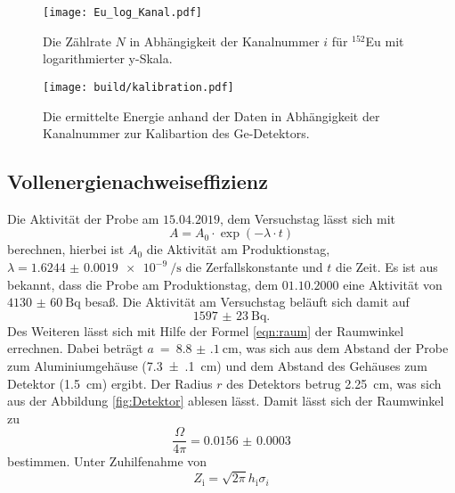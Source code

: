 \begin{figure}[htb]
 \centering
 \texttt{[image: Eu\_log\_Kanal.pdf]}
 \caption{Die Zählrate $N$ in Abhängigkeit der Kanalnummer $i$ für ${}^{152}$Eu mit logarithmierter y-Skala.}
 \label{fig:Eu_log_Kanal}
\end{figure}

\begin{figure}[htb]
 \centering
 \texttt{[image: build/kalibration.pdf]}
 \caption{Die ermittelte Energie anhand der Daten in Abhängigkeit der Kanalnummer zur Kalibartion des Ge-Detektors.}
 \label{fig:kalibration}
\end{figure}


\FloatBarrier

\subsection{Vollenergienachweiseffizienz}
\label{sec:Vollenergienachweiseffizenz}
Die Aktivität der Probe am $15.04.2019$, dem Versuchstag lässt sich mit
\begin{equation}
  A = A_0 \cdot \exp{\left(-\lambda \cdot t\right)}
\end{equation}
berechnen, hierbei ist $A_0$ die Aktivität am Produktionstag,
$\lambda = \SI[per-mode = reciprocal-positive-first]{1.6244(19)e-9}{\per\second}$ \cite{referenz1} 
die Zerfallskonstante und $t$ die Zeit. Es ist aus \cite{V18} bekannt, dass die Probe am Produktionstag, dem
$01.10.2000$ eine Aktivität von $\SI{4130(60)}{\becquerel}$ besaß.
Die Aktivität am Versuchstag beläuft sich damit auf
\begin{equation*}
  \SI{1597(23)}{\becquerel}.
\end{equation*}
Des Weiteren lässt sich mit Hilfe der Formel \ref{eqn:raum} der Raumwinkel errechnen.
Dabei beträgt $a~=~\SI{8.8(1)}{\centi\meter}$, was sich aus dem Abstand der Probe zum
Aluminiumgehäuse (\SI{7.3(1)}{\centi\meter}) und dem Abstand des Gehäuses zum Detektor 
(\SI{1.5}{\centi\meter}) ergibt. Der Radius $r$ des Detektors betrug \SI{2.25}{\centi\meter}, was sich
aus der Abbildung \ref{fig:Detektor} ablesen lässt. Damit lässt sich der Raumwinkel zu
\begin{equation*}
  \frac{\Omega}{4\pi} = \num{0.0156(3)}
\end{equation*}
bestimmen.
Unter Zuhilfenahme von
\begin{equation}
  Z_\text{i} = \sqrt{2\pi} h_\text{i} \sigma_{i}
\end{equation}
